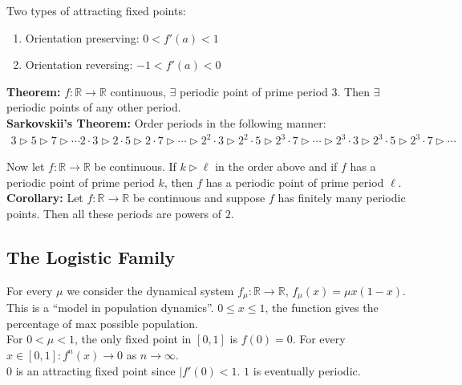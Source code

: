 \documentclass[12pt]{article}
\begin{document}
Two types of attracting fixed points:
\begin{enumerate}
\item Orientation preserving: $0 < f'(a) < 1$
\item Orientation reversing: $-1 < f'(a) < 0$
\end{enumerate}

\textbf{Theorem:} $f: \mathbb{R} \to \mathbb{R}$ continuous, $\exists$ periodic point of prime period $3$. Then $\exists$ periodic points of any other period.\\

\textbf{Sarkovskii's Theorem:} Order periods in the following manner:
\begin{align*}
3 \triangleright 5 \triangleright 7 \triangleright \cdots 2 \cdot 3 \triangleright 2 \cdot 5 \triangleright 2 \cdot 7 \triangleright \cdots \triangleright 2^2 \cdot 3 \triangleright 2^2 \cdot 5 \triangleright 2^3 \cdot 7 \triangleright \cdots \triangleright 2^3 \cdot 3 \triangleright 2^3 \cdot 5 \triangleright 2^3 \cdot 7 \triangleright \cdots
\end{align*}

Now let $f: \mathbb{R} \to \mathbb{R}$ be continuous. If $k \triangleright \ell$ in the order above and if $f$ has a periodic point of prime period $k$, then $f$ has a periodic point of prime period $\ell$.\\

\textbf{Corollary:} Let $f: \mathbb{R} \to \mathbb{R}$ be continuous and suppose $f$ has finitely many periodic points. Then all these periods are powers of $2$.

\subsection{The Logistic Family}

For every $\mu$ we consider the dynamical system $f_{\mu}: \mathbb{R} \to \mathbb{R}$, $f_{\mu}(x) = \mu x (1-x)$.\\

This is a ``model in population dynamics''. $0 \leq x \leq 1$, the function gives the percentage of max possible population.\\

For $0 < \mu < 1$, the only fixed point in $[0, 1]$ is $f(0) = 0$. For every $x \in [0, 1]: f^n(x) \to 0$ as $n \to \infty$.\\

$0$ is an attracting fixed point since $|f'(0) < 1$. $1$ is eventually periodic.\\
\end{document}
